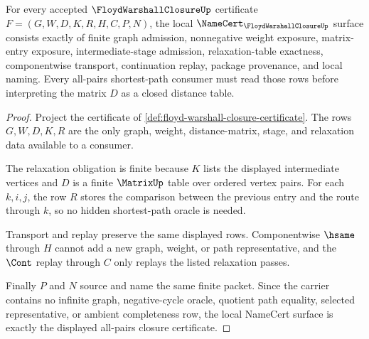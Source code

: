 \begin{theorem}
\label{thm:floyd-warshall-closure-namecert-obligations}
For every accepted $\FloydWarshallClosureUp$ certificate $F=(G,W,D,K,R,H,C,P,N)$, the local $\NameCert_{\FloydWarshallClosureUp}$ surface consists exactly of finite graph admission, nonnegative weight exposure, matrix-entry exposure, intermediate-stage admission, relaxation-table exactness, componentwise transport, continuation replay, package provenance, and local naming. Every all-pairs shortest-path consumer must read those rows before interpreting the matrix $D$ as a closed distance table.
\end{theorem}
\begin{proof}
Project the certificate of \autoref{def:floyd-warshall-closure-certificate}. The rows $G,W,D,K,R$ are the only graph, weight, distance-matrix, stage, and relaxation data available to a consumer.

The relaxation obligation is finite because $K$ lists the displayed intermediate vertices and $D$ is a finite $\MatrixUp$ table over ordered vertex pairs. For each $k,i,j$, the row $R$ stores the comparison between the previous entry and the route through $k$, so no hidden shortest-path oracle is needed.

Transport and replay preserve the same displayed rows. Componentwise $\hsame$ through $H$ cannot add a new graph, weight, or path representative, and the $\Cont$ replay through $C$ only replays the listed relaxation passes.

Finally $P$ and $N$ source and name the same finite packet. Since the carrier contains no infinite graph, negative-cycle oracle, quotient path equality, selected representative, or ambient completeness row, the local NameCert surface is exactly the displayed all-pairs closure certificate.
\end{proof}

